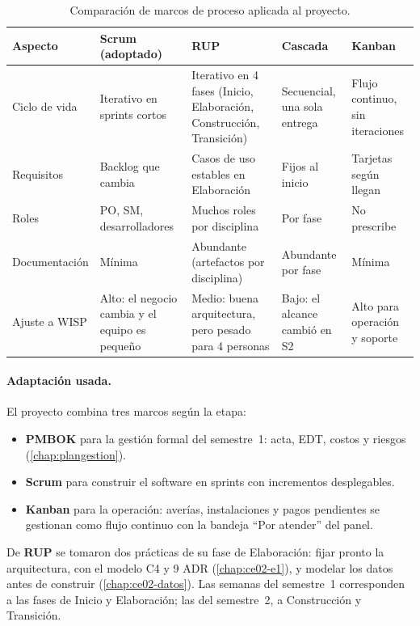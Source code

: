 \begin{table}[H]
\centering
\caption{Comparación de marcos de proceso aplicada al proyecto.}
\label{tab:ce02-e4-marcos}
\small
\begin{tabularx}{\textwidth}{L{2.5cm}*{4}{>{\raggedright\arraybackslash}X}}
\toprule
\textbf{Aspecto} & \textbf{Scrum (adoptado)} & \textbf{RUP} & \textbf{Cascada} & \textbf{Kanban} \\
\midrule
Ciclo de vida & Iterativo en sprints cortos & Iterativo en 4 fases (Inicio, Elaboración, Construcción, Transición) & Secuencial, una sola entrega & Flujo continuo, sin iteraciones \\
Requisitos & Backlog que cambia & Casos de uso estables en Elaboración & Fijos al inicio & Tarjetas según llegan \\
Roles & PO, SM, desarrolladores & Muchos roles por disciplina & Por fase & No prescribe \\
Documentación & Mínima & Abundante (artefactos por disciplina) & Abundante por fase & Mínima \\
Ajuste a WISP & Alto: el negocio cambia y el equipo es pequeño & Medio: buena arquitectura, pero pesado para 4 personas & Bajo: el alcance cambió en S2 & Alto para operación y soporte \\
\bottomrule
\end{tabularx}
\end{table}

\paragraph{Adaptación usada.} El proyecto combina tres marcos según la etapa:
\begin{itemize}
  \item \textbf{PMBOK} para la gestión formal del semestre~1: acta, EDT, costos y riesgos
  (\cref{chap:plangestion}).
  \item \textbf{Scrum} para construir el software en sprints con incrementos desplegables.
  \item \textbf{Kanban} para la operación: averías, instalaciones y pagos pendientes se
  gestionan como flujo continuo con la bandeja ``Por atender'' del panel.
\end{itemize}
De \textbf{RUP} se tomaron dos prácticas de su fase de Elaboración: fijar pronto la
arquitectura, con el modelo C4 y 9 ADR (\cref{chap:ce02-e1}), y modelar los datos antes de
construir (\cref{chap:ce02-datos}). Las semanas del semestre~1 corresponden a las fases de
Inicio y Elaboración; las del semestre~2, a Construcción y Transición.

